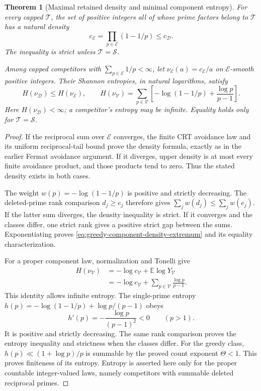 \documentclass[11pt]{article}
\newtheorem{theorem}{Theorem}[section]
\theoremstyle{definition}
\begin{document}
\begin{theorem}[Maximal retained density and minimal component entropy]
\label{thm:greedy-component-density-entropy}
For every capped $\mathcal T$, the set of positive integers all of
whose prime factors belong to $\mathcal T$ has a natural density
\begin{equation}
 c_{\mathcal E}=\prod_{p\in\mathcal E}(1-1/p)
                           \le c_{\mathcal D}.
 \label{eq:greedy-component-density-extremum}
\end{equation}
The inequality is strict unless $\mathcal T=\mathcal S$.

Among capped competitors with $\sum_{p\in\mathcal E}1/p<\infty$,
let $\nu_{\mathcal E}(a)=c_{\mathcal E}/a$ on
$\mathcal E$-smooth positive integers.
Their Shannon entropies, in natural logarithms, satisfy
\begin{equation}
 H(\nu_{\mathcal D})\le H(\nu_{\mathcal E}),\qquad
 H(\nu_{\mathcal V})=
 \sum_{p\in\mathcal V}
 \left[-\log(1-1/p)+\frac{\log p}{p-1}\right].
 \label{eq:greedy-component-entropy-extremum}
\end{equation}
Here $H(\nu_{\mathcal D})<\infty$; a competitor's entropy may
be infinite. Equality holds only for $\mathcal T=\mathcal S$.
\end{theorem}

\begin{proof}
If the reciprocal sum over $\mathcal E$ converges, the finite
CRT avoidance law and its uniform reciprocal-tail bound prove
the density formula, exactly as in the earlier Fermat avoidance
argument. If it diverges, upper density is at most every finite
avoidance product, and those products tend to zero.
Thus the stated density exists in both cases.

The weight $w(p)=-\log(1-1/p)$ is positive and strictly decreasing.
The deleted-prime rank comparison $d_j\ge e_j$ therefore gives
$\sum_jw(d_j)\le\sum_jw(e_j)$.
If the latter sum diverges, the density inequality is strict.
If it converges and the classes differ, one strict rank gives
a positive strict gap between the sums.
Exponentiating proves \eqref{eq:greedy-component-density-extremum}
and its equality characterization.

For a proper component law, normalization and Tonelli give
\[
 \begin{aligned}
 H(\nu_{\mathcal V})
   &=-\log c_{\mathcal V}+\mathbb E\log Y_{\mathcal V}\\
   &=-\log c_{\mathcal V}
              +\sum_{p\in\mathcal V}\frac{\log p}{p-1}.
 \end{aligned}
\]
This identity allows infinite entropy.
The single-prime entropy
$h(p)=-\log(1-1/p)+\log p/(p-1)$ obeys
\[
                              h'(p)=-\frac{\log p}{(p-1)^2}<0
                                      \qquad(p>1).
\]
It is positive and strictly decreasing.
The same rank comparison proves the entropy inequality and
strictness when the classes differ.
For the greedy class, $h(p)\ll(1+\log p)/p$ is summable by the
proved count exponent $\Theta<1$.
This proves finiteness of its entropy.
Entropy is asserted here only for the proper countable integer-valued
laws, namely competitors with summable deleted reciprocal primes.
\end{proof}
\end{document}
